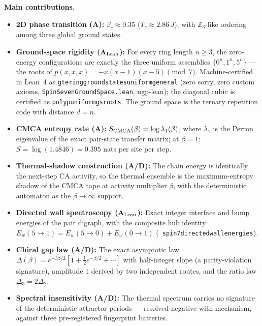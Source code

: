 \documentclass[11pt]{article}
\theoremstyle{remark}
\newcommand{\lean}[1]{%
  \penalty-100
  \begingroup\def\_{\textunderscore\allowbreak}\texttt{#1}\endgroup}
\newcommand{\CatA}{\textbf{A}}
\newcommand{\CatAL}{\ensuremath{\textbf{A}_{\rm Lean}}}
\newcommand{\CatAD}{\textbf{A/D}}
\begin{document}
\medskip
\noindent\textbf{Main contributions.}
\begin{itemize}[leftmargin=2em,itemsep=2pt,topsep=4pt]
  \item \textbf{2D phase transition (\CatA{}):} $\beta_c \approx 0.35$
        ($T_c \approx 2.86\,J$), with $\mathbb{Z}_3$-like ordering among three
        global ground states.
  \item \textbf{Ground-space rigidity (\CatAL{}):} For every ring length
        $n \ge 3$, the zero-energy configurations are exactly the three uniform
        assemblies $\{0^n, 1^n, 5^n\}$ --- the roots of $p(x,x,x) = -x(x-1)(x-5)
        \pmod 7$. Machine-certified in Lean~4 as
        \lean{gte\_ring\_ground\_states\_uniform\_general} (zero sorry, zero
        custom axioms, \texttt{SpinSevenGroundSpace.lean}, ugp-lean); the
        diagonal cubic is certified as \lean{poly\_p\_uniform\_gs\_roots}.
        The ground space is the ternary repetition code with distance $d = n$.
  \item \textbf{CMCA entropy rate (\CatA{}):} $S_{\rm CMCA}(\beta) = \log \lambda_1(\beta)$,
        where $\lambda_1$ is the Perron eigenvalue of the exact pair-state
        transfer matrix; at $\beta = 1$: $S = \log(1.4846) = 0.395$ nats per
        site per step.
  \item \textbf{Thermal-shadow construction (\CatAD{}):} The chain energy is
        identically the next-step CA activity, so the thermal ensemble is the
        maximum-entropy shadow of the CMCA tape at activity multiplier
        $\beta$, with the deterministic automaton as the $\beta \to \infty$
        support.
  \item \textbf{Directed wall spectroscopy (\CatAL{}):} Exact integer
        interface and bump energies of the pair digraph, with the composite
        hub identity $E_w(5{\to}1) = E_w(5{\to}0) + E_w(0{\to}1)$
        \mbox{(\lean{spin7\_directed\_wall\_energies})}.
  \item \textbf{Chiral gap law (\CatAD{}):} The exact asymptotic law
        $\Delta(\beta) = e^{-3\beta/2}[1 + \tfrac{1}{2}e^{-\beta/2} + \cdots]$
        with half-integer slope (a parity-violation signature), amplitude $1$
        derived by two independent routes, and the ratio law
        $\Delta_3 = 2\Delta_2$.
  \item \textbf{Spectral insensitivity (\CatAD{}):} The thermal spectrum
        carries no signature of the deterministic attractor periods ---
        resolved negative with mechanism, against three pre-registered
        fingerprint batteries.

\end{itemize}
\end{document}
